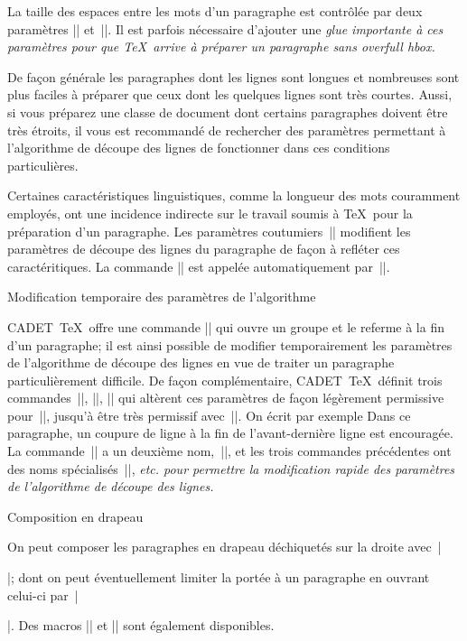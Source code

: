 La taille des espaces entre les mots d'un paragraphe est contrôlée par
deux paramètres |\spaceskip| et~|\xspaceskip|. Il est parfois
nécessaire d'ajouter une \em{glue} importante à ces paramètres pour
que \TeX\ arrive à préparer un paragraphe sans \em{overfull hbox}.

De façon générale les paragraphes dont les lignes sont longues et
nombreuses sont plus faciles à préparer que ceux dont les quelques
lignes sont très courtes. Aussi, si vous préparez une classe de
document dont certains paragraphes doivent être très étroits, il vous
est recommandé de rechercher des paramètres permettant à l'algorithme
de découpe des lignes de fonctionner dans ces conditions
particulières.

Certaines caractéristiques linguistiques, comme la longueur des mots
couramment employés, ont une incidence indirecte sur le travail soumis
à \TeX\ pour la préparation d'un paragraphe. Les paramètres
coutumiers~|\selectparagraph| modifient les paramètres de découpe des
lignes du paragraphe de façon à refléter ces caractéritiques. La
commande |\selectparagraph| est appelée automatiquement
par~|\selectlocale|.


\formalpar Modification temporaire des paramètres de l'algorithme

CADET~\TeX\ offre une commande |\pargroup| qui ouvre un groupe et le
referme à la fin d'un paragraphe; il est ainsi possible de modifier
temporairement les paramètres de l'algorithme de découpe des lignes en
vue de traiter un paragraphe particulièrement difficile. De façon
complémentaire, CADET~\TeX\ définit trois commandes~|\paragraphtricky|,
|\paragraphhard|, |\paragraphnasty| qui altèrent ces paramètres de
façon légèrement permissive pour~|\paragraphtricky|, jusqu'à être très
permissif avec~|\paragraphnasty|. On écrit par exemple
\begincode
\pargroup
{}
Dans ce paragraphe, un coupure de ligne à la fin de
l'avant-dernière ligne est encouragée.
\endcode
La commande~|\pargroup| a un deuxième nom,~|\thisparagraph|, et les
trois commandes précédentes ont des noms
spécialisés~|\thisparagraphtricky|, \em{etc.} pour permettre la
modification rapide des paramètres de l'algorithme de découpe des
lignes.


\formalpar Composition en drapeau

On peut composer les paragraphes en drapeau déchiquetés sur la droite
avec~|\raggedright|; dont on peut éventuellement limiter la portée à
un paragraphe en ouvrant celui-ci
par~|\thisparagraph\raggedright|. Des macros |\raggedleft| et
|\raggedboth| sont également disponibles.


